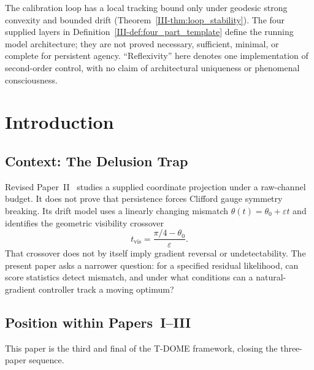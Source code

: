 \documentclass[12pt,a4paper,openany]{book}
\begin{document}
The calibration loop has a local tracking bound only under geodesic
strong convexity and bounded drift (Theorem~\ref{III-thm:loop_stability}).
The four supplied layers in Definition~\ref{III-def:four_part_template}
define the running model architecture; they are not proved necessary,
sufficient, minimal, or complete for persistent agency.  ``Reflexivity''
here denotes one implementation of second-order control, with no claim of
architectural uniqueness or phenomenal consciousness.


\section{Introduction}
\label{III-sec:intro}

\subsection{Context: The Delusion Trap}
\label{III-subsec:delusion_context}

Revised Paper~II~\cite{Liu2026TDOME_II} studies a supplied
coordinate projection under a raw-channel budget.  It does not prove
that persistence forces Clifford gauge symmetry breaking.  Its drift
model uses a linearly changing mismatch
$\theta(t)=\theta_0+\varepsilon t$ and identifies the geometric
visibility crossover
\begin{equation}
\label{III-eq:t_del_recall}
t_{\mathrm{vis}}
=\frac{\pi/4-\theta_0}{\varepsilon}.
\end{equation}
That crossover does not by itself imply gradient reversal or
undetectability.  The present paper asks a narrower question: for a
specified residual likelihood, can score statistics detect mismatch,
and under what conditions can a natural-gradient controller track a
moving optimum?

\subsection{Position within Papers~I--III}
\label{III-subsec:sequence}

This paper is the third and final of the T-DOME framework,
closing the three-paper sequence.
\end{document}
